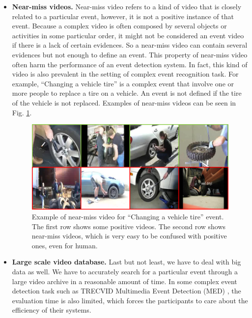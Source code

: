 \begin{itemize}
	\item{\textbf{Near-miss videos.}} Near-miss video refers to a kind of video that is closely related to a particular event, however, it is not a positive instance of that event. Because a complex video is often composed by several objects or activities in some particular order, it might not be considered an event video if there is a lack of certain evidences. So a near-miss video can contain several evidences but not enough to define an event. This property of near-miss video often harm the performance of an event detection system. In fact, this kind of video is also prevalent in the setting of complex event recognition task. For example, ``Changing a vehicle tire'' is a complex event that involve one or more people to replace a tire on a vehicle. An event is not defined if the tire of the vehicle is not replaced. Examples of near-miss videos can be seen in Fig. \ref{c1_nearmiss}.
	
	\begin{figure}
		\centering
		\includegraphics[width=1\textwidth]{near_miss.png}
		\caption{Example of near-miss video for ``Changing a vehicle tire'' event. The first row shows some positive videos. The second row shows near-miss videos, which is very easy to be confused with positive ones, even for human.}
		\label{c1_nearmiss}
	\end{figure}
		
	\item{\textbf{Large scale video database.}} Last but not least, we have to deal with big data as well. We have to accurately search for a particular event through a large video archive in a reasonable amount of time. In some complex event detection task such as  TRECVID Multimedia Event Detection (MED) , the evaluation time is also limited, which forces the participants to care about the efficiency of their systems.
	
\end{itemize}

